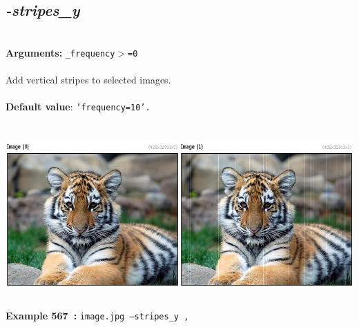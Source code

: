\documentclass[a4paper,11pt,twoside]{book}
\begin{document}
\subsection{\emph{-stripes\_y} }\vspace*{-0.5em}
~\\\textbf{Arguments: } 
{\small \texttt{\_frequency$>$=0}}\\~\\
Add vertical stripes to selected images.
~\\~\\\textbf{Default value}: {\small \texttt{'frequency=10'.}}
\begin{center}\includegraphics[keepaspectratio=true,height=7cm,width=\textwidth]{img/gmic_def567.jpg}\\
{\footnotesize \textbf{Example 567~:} \texttt{image.jpg --stripes\_y ,}}
\end{center}
\end{document}
